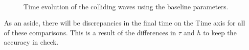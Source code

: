 \documentclass[12pt]{article}
\numberwithin{equation}{section}
\numberwithin{figure}{section}
\numberwithin{table}{section}
\begin{document}
\begin{figure}[H]%
    \centering
    \,
    \caption{Time evolution of the colliding waves using the baseline parameters.}
    \label{fig:Mains}
\end{figure}
\par As an aside, there will be discrepancies in the final time on the Time axis for all of these comparisons. This is a result of the differences in $\tau$ and $h$ to keep the accuracy in check.
\end{document}
